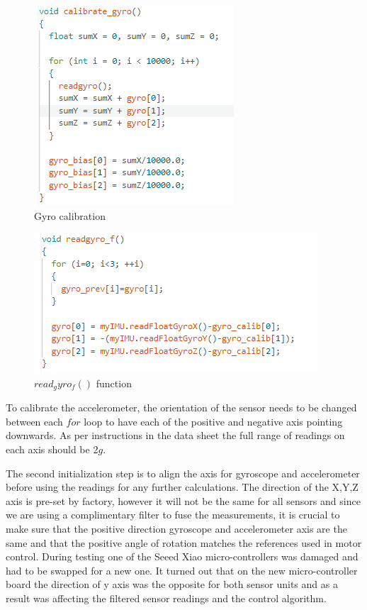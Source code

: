 \begin{figure}[H]
    \begin{center}
    \includegraphics[scale = 0.85]{pictures/IMU/gyro_calibrate.png}
    \end{center}
    \caption{Gyro calibration}
    \label{fig:my_label}
\end{figure}

\begin{figure}[H]
    \begin{center}
    \includegraphics[scale = 0.85]{pictures/IMU/read_gyro_f.png}
    \end{center}
    \caption{$read_gyro_f()$ function}
    \label{fig:my_label}
\end{figure}


To calibrate the accelerometer,  the orientation of the sensor needs to be changed between each $for$ loop to have each of the positive and negative axis pointing downwards. As per instructions in the data sheet the full range of readings on each axis should be 2$g$. 

The second initialization step is to align the axis for gyroscope and accelerometer before using the readings for any further calculations.
The direction of the X,Y,Z axis is pre-set by factory, however it will not be the same for all sensors and since we are using a complimentary filter to fuse the measurements, it is crucial to make sure that the positive direction gyroscope and accelerometer axis are the same and that the positive angle of rotation matches the references used in motor control. \newline
During testing one of the Seeed Xiao micro-controllers was damaged and had to be swapped for a new one. It turned out that on the new micro-controller board the direction of y axis was the opposite for both sensor units and as a result was affecting the filtered sensor readings and the control algorithm. \newline

